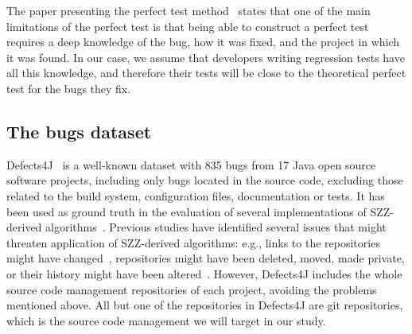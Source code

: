 The paper presenting the perfect test method~\cite{rodriguez2020bugs} states that one of the main limitations of the perfect test is that being able to construct a perfect test requires a deep knowledge of the bug, how it was fixed, and the project in which it was found. 
In our case, we assume that developers writing regression tests have all this knowledge, and therefore their tests will be close to the theoretical perfect test for the bugs they fix.


\subsection{The bugs dataset}
\label{subsec:dataset}

Defects4J~\cite{just2014defects4j} is a well-known dataset with 835 bugs from 17 Java open source software projects, including only bugs located in the source code, excluding those related to the build system, configuration files, documentation or tests. It has been used as ground truth in the evaluation of several implementations of SZZ-derived algorithms~\cite{neto2019revisiting,pokropinski2022szz,wen2019exploring,an2021reducing}. 
Previous studies have identified several issues that might threaten application of SZZ-derived algorithms: e.g., links to the repositories might have  changed~\cite{lawrence2001persistence}, repositories might have been deleted, moved, made private, or their history might have been altered~\cite{bird2009:promises_perils_git}.
However, Defects4J includes the whole source code management repositories of each project, avoiding the problems mentioned above.
All but one of the repositories in Defects4J are git repositories, which is the source code management we will target in our study.


